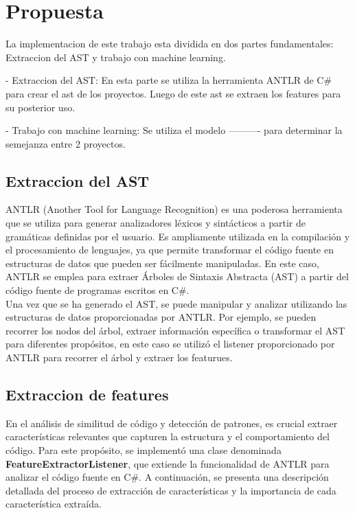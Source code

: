 \chapter{Propuesta}\label{chapter:proposal}

La implementacion  de este trabajo esta dividida en dos partes fundamentales: Extraccion del AST y trabajo con machine learning.

- Extraccion del AST: En esta parte se utiliza la herramienta ANTLR de C# para crear el ast de los proyectos. Luego de este ast se extraen los features para su posterior uso.

- Trabajo con machine learning: Se utiliza el modelo ---------- para determinar la semejanza entre 2 proyectos.


\section{Extraccion del AST}

ANTLR (Another Tool for Language Recognition) es una poderosa herramienta que se utiliza para generar analizadores léxicos y sintácticos a partir de gramáticas definidas por el usuario. Es ampliamente utilizada en la compilación y el procesamiento de lenguajes, ya que permite transformar el código fuente en estructuras de datos que pueden ser fácilmente manipuladas. En este caso, ANTLR se emplea para extraer Árboles de Sintaxis Abstracta (AST) a partir del código fuente de programas escritos en C#. \\

Una vez que se ha generado el AST, se puede manipular y analizar utilizando las estructuras de datos proporcionadas por ANTLR. Por ejemplo, se pueden recorrer los nodos del árbol, extraer información específica o transformar el AST para diferentes propósitos, en este caso se utilizó el listener proporcionado por ANTLR para recorrer el árbol y extraer los featurues. \\

\section{Extraccion de features}

En el análisis de similitud de código y detección de patrones, es crucial extraer características relevantes que capturen la estructura y el comportamiento del código. Para este propósito, se implementó una clase denominada {\bf FeatureExtractorListener}, que extiende la funcionalidad de ANTLR para analizar el código fuente en C#. A continuación, se presenta una descripción detallada del proceso de extracción de características y la importancia de cada característica extraída. \\

